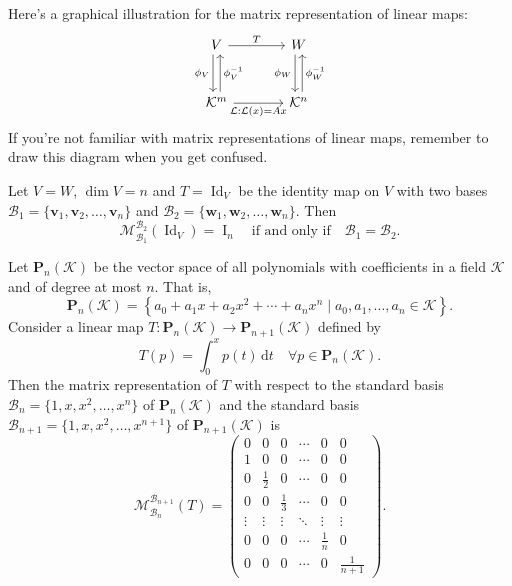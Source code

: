 	\begin{remarkenv}
		Here's a graphical illustration for the matrix representation of linear maps:
		\[
		\begin{tikzcd}[row sep=large, column sep=large]
		V
		\arrow[r, "T"]
		\arrow[d, xshift=-0.6ex, "\phi_V"']
		& W
		\arrow[d, xshift=-0.6ex, "\phi_W"'] \\
		\mathcal{K}^m
		\arrow[r, "\mathcal{L}: \mathcal{L}(x)=A x"']
		\arrow[u, xshift=0.6ex, "\phi_V^{-1}" ']
		& \mathcal{K}^n
		\arrow[u, xshift=0.6ex, "\phi_W^{-1}"']
		\end{tikzcd}
		\]
		If you're not familiar with matrix representations of linear maps, remember to draw this diagram when you get confused.
	\end{remarkenv}
	\begin{propositionenv}
		Let $V=W$, $\dim V = n$ and $T = \operatorname{Id}_V$ be the identity map on $V$ with two bases $\mathcal{B}_1=\{\bm{v}_1, \bm{v}_2, \dots, \bm{v}_n\}$ and $\mathcal{B}_2=\{ \bm{w}_1, \bm{w}_2, \dots, \bm{w}_n\}$. Then
		\[
		\mathcal{M}^{\mathcal{B}_2}_{\mathcal{B}_1}(\operatorname{Id}_V) = \operatorname{I}_n\quad \text{if and only if} \quad \mathcal{B}_1 = \mathcal{B}_2.
		\]
		
	\end{propositionenv}
	\begin{exampleenv}
		Let $\bm{P}_n(\mathcal{K})$ be the vector space of all polynomials with coefficients in a field $\mathcal{K}$ and of degree at most $n$. That is,
		\[
		\bm{P}_n(\mathcal{K}) = \left\{ a_0 + a_1 x + a_2 x^2 + \cdots + a_n x^n \mid a_0, a_1, \dots, a_n \in \mathcal{K} \right\}.
		\]
		Consider a linear map $T: \bm{P}_n(\mathcal{K}) \to \bm{P}_{n+1}(\mathcal{K})$ defined by
		\[
		T(p)=\int_0 ^x p(t) \,\mathrm{d}t\quad \forall p \in \bm{P}_n(\mathcal{K}).
		\]
		Then the matrix representation of $T$ with respect to the standard basis $\mathcal{B}_{n} = \{1, x, x^2, \dots, x^n\}$ of $\bm{P}_n(\mathcal{K})$ and the standard basis $\mathcal{B}_{n+1} = \{1, x, x^2, \dots, x^{n+1}\}$ of $\bm{P}_{n+1}(\mathcal{K})$ is
		\[\mathcal{M}^{\mathcal{B}_{n+1}}_{\mathcal{B}_n}(T) =
		\begin{pmatrix}
			0 & 0 & 0 & \cdots & 0 & 0 \\
			1 & 0 & 0 & \cdots & 0 & 0 \\
			0 & \frac{1}{2} & 0 & \cdots & 0 & 0 \\
			0 & 0 & \frac{1}{3} & \cdots & 0 & 0 \\
			\vdots & \vdots & \vdots & \ddots & \vdots & \vdots \\
			0 & 0 & 0 & \cdots & \frac{1}{n} & 0 \\
			0 & 0 & 0 & \cdots & 0 & \frac{1}{n+1}
		\end{pmatrix}.
		\]
	\end{exampleenv}
